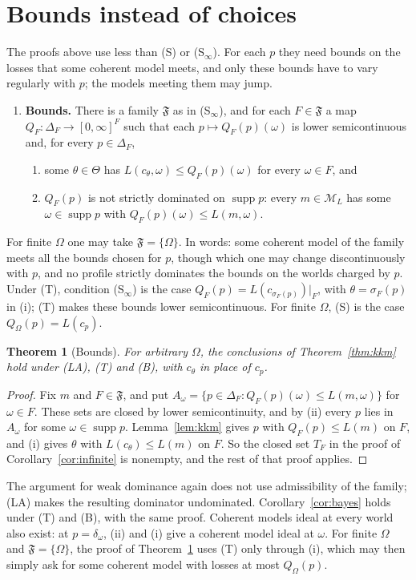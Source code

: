 \documentclass[11pt]{article}
\newtheorem{theorem}{Theorem}[section]
\theoremstyle{definition}
\theoremstyle{remark}
\newcommand{\M}{\mathcal M}
\newcommand{\F}{\mathfrak F}
\newcommand{\supp}{\operatorname{supp}}
\begin{document}
\appendix
\section{Bounds instead of choices}\label{sec:bounds}
The proofs above use less than (S) or (S$_\infty$). For each $p$ they need bounds on the losses that some coherent model meets, and only these bounds have to vary regularly with $p$; the models meeting them may jump.
\begin{enumerate}[label=\textbf{(B)},leftmargin=*]
\item \textbf{Bounds.} There is a family $\F$ as in (S$_\infty$), and for each $F\in\F$ a map $Q_F:\Delta_F\to[0,\infty]^F$ such that each $p\mapsto Q_F(p)(\omega)$ is lower semicontinuous and, for every $p\in\Delta_F$,
\begin{enumerate}[label=(\roman*)]
\item some $\theta\in\Theta$ has $L(c_\theta,\omega)\le Q_F(p)(\omega)$ for every $\omega\in F$, and
\item $Q_F(p)$ is not strictly dominated on $\supp p$: every $m\in\M_L$ has some $\omega\in\supp p$ with $Q_F(p)(\omega)\le L(m,\omega)$.
\end{enumerate}
\end{enumerate}
For finite $\Omega$ one may take $\F=\{\Omega\}$. In words: some coherent model of the family meets all the bounds chosen for $p$, though which one may change discontinuously with $p$, and no profile strictly dominates the bounds on the worlds charged by $p$. Under (T), condition (S$_\infty$) is the case $Q_F(p)=L(c_{\sigma_F(p)})|_F$, with $\theta=\sigma_F(p)$ in (i); (T) makes these bounds lower semicontinuous. For finite $\Omega$, (S) is the case $Q_\Omega(p)=L(c_p)$.

\begin{theorem}[Bounds]\label{thm:bounds}
For arbitrary $\Omega$, the conclusions of Theorem~\ref{thm:kkm} hold under (LA), (T) and (B), with $c_\theta$ in place of $c_p$.
\end{theorem}
\begin{proof}
Fix $m$ and $F\in\F$, and put $A_\omega=\{p\in\Delta_F:Q_F(p)(\omega)\le L(m,\omega)\}$ for $\omega\in F$. These sets are closed by lower semicontinuity, and by (ii) every $p$ lies in $A_\omega$ for some $\omega\in\supp p$. Lemma~\ref{lem:kkm} gives $p$ with $Q_F(p)\le L(m)$ on $F$, and (i) gives $\theta$ with $L(c_\theta)\le L(m)$ on $F$. So the closed set $T_F$ in the proof of Corollary~\ref{cor:infinite} is nonempty, and the rest of that proof applies.
\end{proof}
The argument for weak dominance again does not use admissibility of the family; (LA) makes the resulting dominator undominated. Corollary~\ref{cor:bayes} holds under (T) and (B), with the same proof. Coherent models ideal at every world also exist: at $p=\delta_\omega$, (ii) and (i) give a coherent model ideal at $\omega$. For finite $\Omega$ and $\F=\{\Omega\}$, the proof of Theorem~\ref{thm:bounds} uses (T) only through (i), which may then simply ask for some coherent model with losses at most $Q_\Omega(p)$.
\end{document}
